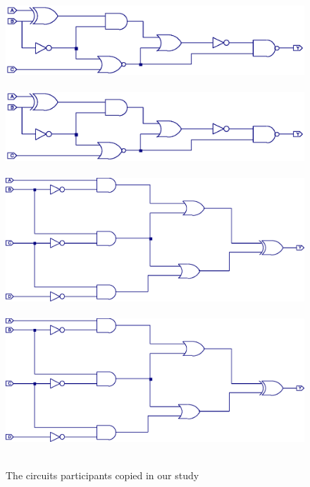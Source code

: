 \documentclass{egpubl}
\begin{document}
\begin{figure}
\mbox{
\ifpdf \includegraphics[width=1.0\hsize]{circuit_1}
\else \includegraphics[width=1.0\hsize]{circuit_1.eps} \fi}
\mbox{
\ifpdf \includegraphics[width=1.0\hsize]{circuit_2}
\else \includegraphics[width=1.0\hsize]{circuit_2.eps} \fi}
\caption{The circuits participants copied in our study}
\label{copyFig}
\end{figure}
\end{document}
